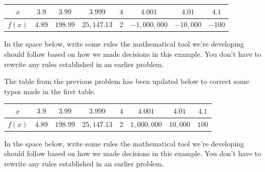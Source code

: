 \documentclass[10pt]{article}
\begin{document}
\begin{center}
\begin{tabular}{| c || c c c c c c c |}
\hline
 $x$  & $3.9$ & $3.99$ & $3.999$ & $4$ & $4.001$ & $4.01$ & $4.1$\\ 
 \hline
 $f(x)$ & $4.89$ & $198.99$  & $25,147.13$ & $2$ & $-1,000,000$   & $-10,000$  & $-100$\\
 \hline
\end{tabular}
\end{center}
In the space below, write some rules the mathematical tool we're developing should follow based on how we made decisions in this example. You don't have to rewrite any rules established in an earlier problem.

\vfill

 The table from the previous problem has been updated below to correct some typos made in the first table.

\begin{center}
\begin{tabular}{| c || c c c c c c c |}
\hline
 $x$  & $3.9$ & $3.99$ & $3.999$ & $4$ & $4.001$ & $4.01$ & $4.1$\\ 
 \hline
 $f(x)$ & $4.89$ & $198.99$  & $25,147.13$ & $2$ & $1,000,000$   & $10,000$  & $100$\\
 \hline
\end{tabular}
\end{center}
In the space below, write some rules the mathematical tool we're developing should follow based on how we made decisions in this example. You don't have to rewrite any rules established in an earlier problem.
\end{document}
